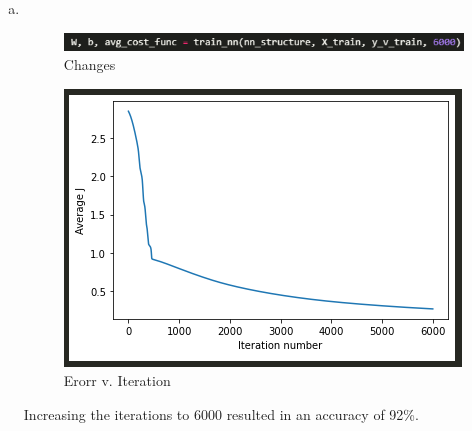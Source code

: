 \documentclass[12pt]{article}
\begin{document}
\begin{enumerate}[(a)]
	\item \,
		\begin{figure}[H]
			\centering
			\includegraphics[width=\textwidth/2]{images/7echange.png}
			\caption{Changes}
			\label{fig:7:e:change}
		\end{figure}
		\begin{figure}[H]
			\centering
			\includegraphics[width=\textwidth/2]{images/7egraph.png}
			\caption{Erorr v. Iteration}
			\label{fig:7:e:graph}
		\end{figure}
		Increasing the iterations to 6000 resulted in an accuracy of 92\%.
		

\end{enumerate}
\end{document}

